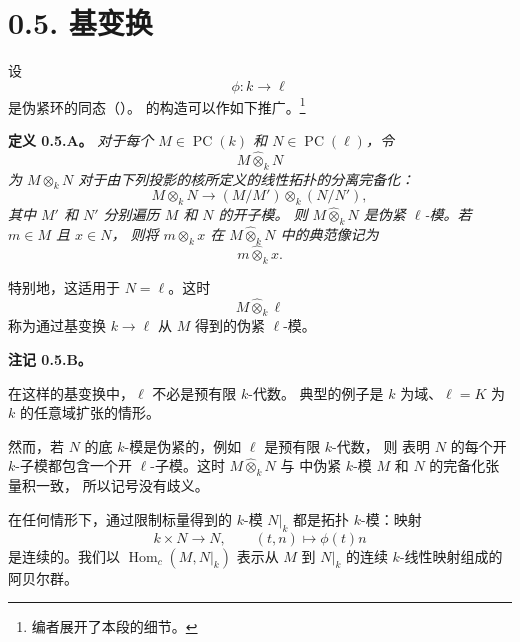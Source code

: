 
\section*{0.5. 基变换}
\label{sga3:VIIB:0.5}

设
\[
  \phi:k\longrightarrow\ell
\]
是伪紧环的同态（）。
 的构造可以作如下推广。\footnote{编者展开了本段的细节。}

\medskip
\noindent\textbf{定义 0.5.A。}
\label{sga3:VIIB:0.5.A}
{\itshape 对于每个 \(M\in\operatorname{PC}(k)\) 和
\(N\in\operatorname{PC}(\ell)\)，令
\[
  M\widehat{\otimes}_kN
\]
为 \(M\otimes_kN\) 对于由下列投影的核所定义的线性拓扑的分离完备化：
\[
  M\otimes_kN
  \longrightarrow
  (M/M')\otimes_k(N/N'),
\]
其中 \(M'\) 和 \(N'\) 分别遍历 \(M\) 和 \(N\) 的开子模。
则 \(M\widehat{\otimes}_kN\) 是伪紧 \(\ell\)-模。若 \(m\in M\) 且 \(x\in N\)，
则将 \(m\otimes_kx\) 在 \(M\widehat{\otimes}_kN\) 中的典范像记为
\[
  m\widehat{\otimes}_kx.
\]}

特别地，这适用于 \(N=\ell\)。这时
\[
  M\widehat{\otimes}_k\ell
\]
称为通过基变换 \(k\to\ell\) 从 \(M\) 得到的伪紧 \(\ell\)-模。

\medskip
\noindent\textbf{注记 0.5.B。}
\label{sga3:VIIB:0.5.B}

\noindent\textit{}
在这样的基变换中，\(\ell\) 不必是预有限 \(k\)-代数。
典型的例子是 \(k\) 为域、\(\ell=K\) 为 \(k\) 的任意域扩张的情形。

\smallskip
\noindent\textit{}
然而，若 \(N\) 的底 \(k\)-模是伪紧的，例如 \(\ell\) 是预有限 \(k\)-代数，
则  表明 \(N\) 的每个开 \(k\)-子模都包含一个开
\(\ell\)-子模。这时 \(M\widehat{\otimes}_kN\) 与
 中伪紧 \(k\)-模 \(M\) 和 \(N\) 的完备化张量积一致，
所以记号没有歧义。

在任何情形下，通过限制标量得到的 \(k\)-模 \(N|_k\) 都是拓扑 \(k\)-模：映射
\[
  k\times N\longrightarrow N,
  \qquad
  (t,n)\longmapsto\phi(t)n
\]
是连续的。我们以 \(\operatorname{Hom}_c(M,N|_k)\) 表示从 \(M\) 到
\(N|_k\) 的连续 \(k\)-线性映射组成的阿贝尔群。

